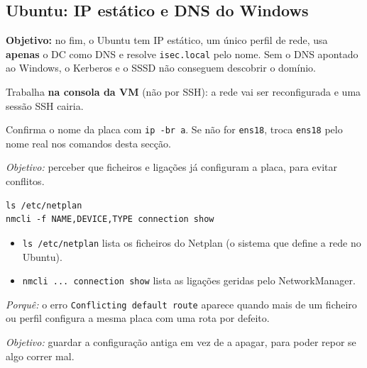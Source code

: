 
\subsection[Ubuntu: IP estático e DNS do Windows]{Ubuntu: IP estático e DNS do Windows}


\textbf{Objetivo:} no fim, o Ubuntu tem IP estático, um único perfil de rede, usa \textbf{apenas} o DC como DNS e resolve \texttt{isec.local} pelo nome. Sem o DNS apontado ao Windows, o Kerberos e o SSSD não conseguem descobrir o domínio.


Trabalha \textbf{na consola da VM} (não por SSH): a rede vai ser reconfigurada e uma sessão SSH cairia.

\begin{simplesbox}
Confirma o nome da placa com \texttt{ip -br a}. Se não for \texttt{ens18}, troca \texttt{ens18} pelo nome real nos comandos desta secção.
\end{simplesbox}


\emph{Objetivo:} perceber que ficheiros e ligações já configuram a placa, para evitar conflitos.

\begin{lstlisting}[style=bashstyle]
ls /etc/netplan
nmcli -f NAME,DEVICE,TYPE connection show
\end{lstlisting}

\begin{itemize}
\item \texttt{ls /\allowbreak{}etc/\allowbreak{}netplan} lista os ficheiros do Netplan (o sistema que define a rede no Ubuntu).
\item \texttt{nmcli ... connection show} lista as ligações geridas pelo NetworkManager.
\end{itemize}

\emph{Porquê:} o erro \texttt{Conflicting default route} aparece quando mais de um ficheiro ou perfil configura a mesma placa com uma rota por defeito.


\emph{Objetivo:} guardar a configuração antiga em vez de a apagar, para poder repor se algo correr mal.

